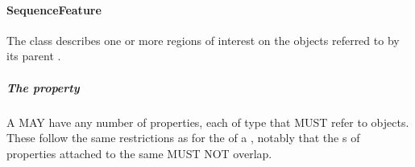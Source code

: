\paragraph{SequenceFeature}
\label{sec:SequenceFeature}

The  class describes one or more regions of interest on the  objects referred to by its parent . 

\subparagraph{The  property}\label{sec:hasLocation:SF}

A  MAY have any number of  properties, each of type  that MUST refer to  objects. 
These follow the same restrictions as for the  of a , notably that the s of  properties attached to the same  MUST NOT overlap.

